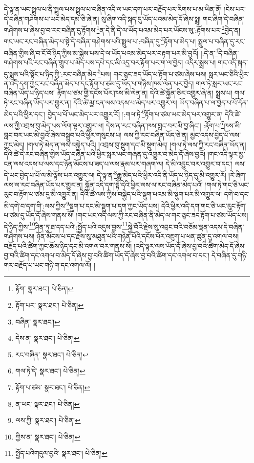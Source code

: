 དེ་ལྟ་ན་ཡང་སྤྲུལ་པ་ནི་སྤྲུལ་པས་སྤྲུལ་པ་བཞིན་འདི་ལ་ཡང་དག་པར་བརྗོད་པར་རིགས་པ་མ་ཡིན་ནོ། །ངེས་པར་དེ་བཞིན་གཤེགས་པ་ཡང་མེད་དམ་ཅི་ཞེ་ན། སུ་ཞིག་འདི་སྐད་དུ་ཡོད་པའམ་མེད་དོ་ཞེས་སྨྲ། གང་ཞིག་དེ་བཞིན་གཤེགས་པ་ཞེས་བྱ་བ་རང་བཞིན་དུ་རྟོགས་\footnote{རྟོག་  སྣར་ཐང་།  པེ་ཅིན། }ན་དེ་ནི་དེ་ལ་ཡོད་པའམ་མེད་པར་ཡོངས་སུ་:རྟོགས་པར་\footnote{རྟོག་པར་  སྣར་ཐང་།  པེ་ཅིན། }བྱེད་ན། གང་ཡང་རང་བཞིན་མེད་པ་སྟེ་དེ་བཞིན་གཤེགས་པའི་སྤྲུལ་པ་:བཞིན་དུ་\footnote{བཞིན་  སྣར་ཐང་། }རྟོག་པ་མེད་པ། སྤྲུལ་པ་བཞིན་དུ་རང་བཞིན་གྱིས་ཞི་བ་ངོ་བོ་ཉིད་ཀྱིས་མ་སྐྱེས་པས་དེ་ལ་ཡོད་པའམ་མེད་པར་བརྟག་པར་མི་བྱའོ། །:དེ་ན་\footnote{དེས་ན་  སྣར་ཐང་།  པེ་ཅིན། }དེ་བཞིན་གཤེགས་པའི་རང་བཞིན་གྲུབ་པ་མེད་པས་དཔེ་དང་མི་འདྲ་བར་རྟོག་པར་ག་ལ་བྱེད། འདིར་སྨྲས་པ། གང་འདི་སྐད་དུ་སྨྲས་པའི་སྟོང་པ་ཉིད་ཀྱི་:རང་བཞིན་མེད་\footnote{རང་བཞིན་  སྣར་ཐང་།  པེ་ཅིན། }པས། གང་ཅུང་ཟད་ཡོད་པ་རྟོག་པ་ཙམ་ཞེས་པས། སླར་ཡང་ཅིའི་ཕྱིར་ན་འདི་དག་ཀྱང་རང་བཞིན་མེད་པ་དང་རྟོག་པ་ཙམ་དུ་ཡོད་པ་གཉིས་ཁས་ལེན་པར་བྱེད། གལ་ཏེ་སླར་ཡང་རང་བཞིན་ཡོད་པ་ཉིད་པས། རྟོག་པ་ཙམ་གྱི་དངོས་པོར་ཁས་མི་ལེན་ན། དེའི་ཚེ་སྐྱོན་ཅིར་འགྱུར་ཞེ་ན། སྨྲས་པ། གལ་ཏེ་རང་བཞིན་ཡོད་པར་གྱུར་ན། དེའི་ཚེ་མྱ་ངན་ལས་འདས་པ་མེད་པར་འགྱུར་ལ། ཡོད་བཞིན་པ་ལ་བྱེད་པ་པོ་དོན་མེད་པའི་ཕྱིར་དང་། བྱེད་པ་པོ་ཡང་མེད་པར་འགྱུར་རོ། །:གལ་ཏེ་\footnote{གལ་ཏེ་དེ་  སྣར་ཐང་།  པེ་ཅིན། }རྟོག་པ་ཙམ་ཡང་མེད་པར་འགྱུར་ན། དེའི་ཚེ་ལས་ཀྱི་འབྲས་བུ་མེད་པས་ལོག་ལྟར་འགྱུར་ལ། དེས་ན་རང་བཞིན་ཁས་བླང་བར་མི་བྱ་ཞིང་། :རྟོག་པ་\footnote{རྟོག་པ་ཙམ་  སྣར་ཐང་།  པེ་ཅིན། }ཁས་མི་བླང་བར་ཡང་མི་བྱའོ་ཞེས་བསྒྲུབ་པའི་ཕྱིར་གསུངས་པ། ལས་ཀྱི་རང་བཞིན་ཡོད་ཅེ་ན། མྱང་འདས་བྱེད་པོ་ལས་ཀྱང་མེད། །གལ་ཏེ་མེད་ན་ལས་བསྐྱེད་པའི། །འབྲས་བུ་སྡུག་དང་མི་སྡུག་མེད། །གལ་ཏེ་ལས་ཀྱི་རང་བཞིན་ཡོད་ན། དེའི་ཚེ་དེ་རང་བཞིན་གྱིས་ཡོད་བཞིན་པའི་ཕྱིར་སླར་ཡང་གཞན་དུ་འགྱུར་བ་མེད་དོ་ཞེས་བྱའོ། །གང་འདི་ལྟར་མྱ་ངན་ལས་འདས་པ་ལས་དང་ཉོན་མོངས་པ་ཟད་པ་ལས་རྣམ་པར་གཞག་ལ། དེ་མི་འབྱུང་བར་འགྱུར་བ་དང་། ལས་དེ་ཡང་བྱེད་པ་པོ་ལ་མི་ལྟོས་པར་འགྱུར་ལ། དེ་ལྟ་ན་\footnote{ན་ཡང་  སྣར་ཐང་།  པེ་ཅིན། }རྒྱུ་མེད་པའི་ཕྱིར་འདི་ནི་ཡོད་པ་ཉིད་དུ་མི་འགྱུར་རོ། །རེ་ཞིག་ལས་ལ་རང་བཞིན་ཡོད་པར་གྱུར་ན། སྐྱོན་འདི་དག་སྟེ་དེའི་ཕྱིར་ལས་ལ་རང་བཞིན་མེད་པའོ། །གལ་ཏེ་གང་ཅི་ཡང་རུང་བ་རྟོག་པ་ཙམ་དུ་མི་འགྱུར་ན། དེའི་ཚེ་ལས་ཀྱིས་བསྐྱེད་པའི་སྡུག་པའམ་མི་སྡུག་པར་མི་འགྱུར་ལ། དགེ་བ་དང་མི་དགེ་བ་དག་གི་:ལས་ཀྱིས་\footnote{ལས་ཀྱི་  སྣར་ཐང་།  པེ་ཅིན། }སྡུག་པ་དང་མི་སྡུག་པ་དག་ཀྱང་ཡོད་པས། དེའི་ཕྱིར་འདི་དག་གང་ཅི་ཡང་རུང་རྟོག་པ་ཙམ་དུ་ཡོད་དོ་ཞེས་གནས་སོ། །གང་ཡང་འདི་ལས་ཀྱི་རང་བཞིན་ནི་མེད་ལ་གང་ཅུང་ཟད་རྟོག་པ་ཙམ་ཡོད་པས། དེ་ཉིད་ཀྱིས་\footnote{ཀྱིས་ན་  སྣར་ཐང་།  པེ་ཅིན། }ཤིན་ཏུ་ཐ་དད་པའི་:སྤྱོད་པའི་འདུས་བྱས་\footnote{སྤྱོད་པའིགདུལ་བྱའི་  སྣར་ཐང་།  པེ་ཅིན། }སྐྱེ་བོའི་རྗེས་སུ་འབྲང་བའི་བཅོམ་ལྡན་འདས་དེ་བཞིན་གཤེགས་པས། ཉོན་མོངས་པ་དང་རྗེས་སུ་མཐུན་པའི་གཉེན་པོའི་དངོས་པོར་འཇུག་པ་ཕན་ཚུན་དུ་འགལ་བས། བརྗོད་པའི་ཚིག་ཀྱང་ཆོས་ཉིད་དང་མི་འགལ་བར་གནས་སོ། །འདི་ལྟར་ལས་ཡོད་དོ་ཞེས་བྱ་བའི་ཚིག་མེད་དོ་ཞེས་བྱ་བའི་ཚིག་དང་འགལ་བ་མེད་དོ་ཞེས་བྱ་བའི་ཚིག་ཡོད་དོ་ཞེས་བྱ་བའི་ཚིག་དང་འགལ་བ་དང་། དེ་བཞིན་དུ་གཉི་གར་བརྗོད་པ་ཡང་གཉི་ག་དང་འགལ་ལོ། །
